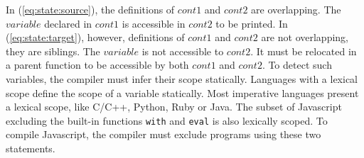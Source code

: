 In (\ref{eq:state:source}), the definitions of $cont1$ and $cont2$ are
overlapping. The $variable$ declared in $cont1$ is accessible in $cont2$ to be
printed. In (\ref{eq:state:target}), however, definitions of $cont1$ and
$cont2$ are not overlapping, they are siblings. The $variable$ is not
accessible to $cont2$. It must be relocated in a parent function to be
accessible by both $cont1$ and $cont2$. To detect such variables, the compiler
must infer their scope statically. Languages with a lexical scope define the
scope of a variable statically. Most imperative languages present a lexical
scope, like C/C++, Python, Ruby or Java. The subset of Javascript excluding
the built-in functions \texttt{with} and \texttt{eval} is also lexically
scoped. To compile Javascript, the compiler must exclude programs using these
two statements.
